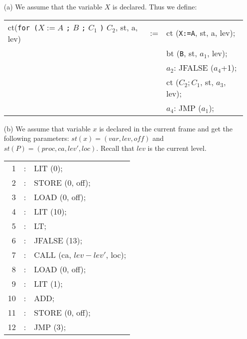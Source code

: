 \begin{solution}
  \begin{enumerate}
    \item[(a)] We assume that the variable $X$ is declared. Thus we define: \\
      \begin{tabular}{lcl}
        ct(\texttt{for ($X := A$} \texttt{;} $B$ \texttt{;} $C_1$ \texttt{)} $C_2$, st, a, lev) & := & 
                ct (\texttt{X:=A}, st, a, lev); \\
            & & bt (\texttt{B}, st, $a_1$, lev); \\
            & & $a_2$: JFALSE ($a_4$+1);  \\
            & & ct (\texttt{$C_2;C_1$}, st, $a_3$, lev);\\
            & & $a_4$: JMP ($a_1$);
      \end{tabular}

    \item[(b)] We assume that variable $x$ is declared in the current frame and get the following parameters:
      $st(x) = (var, lev, \textit{off})$ and $st(P)= (proc, ca, lev',loc)$. Recall that $lev$ is the current level.

      \begin{tabular}{rcl}
         1 & : \hspace{0.3cm} & LIT (0);\\
         2 & : \hspace{0.3cm} & STORE (0, off);\\
         3 & : \hspace{0.3cm} & LOAD (0, off);\\
         4 & : \hspace{0.3cm} & LIT (10);\\
         5 & : \hspace{0.3cm} & LT; \\
         6 & : \hspace{0.3cm} & JFALSE (13);\\
         7 & : \hspace{0.3cm} & CALL (ca, $lev-lev'$, loc);\\
         8 & : \hspace{0.3cm} & LOAD (0, off);\\
         9 & : \hspace{0.3cm} & LIT (1); \\
         10 & : \hspace{0.3cm} & ADD; \\
         11 & : \hspace{0.3cm} & STORE (0, off); \\
         12 & : \hspace{0.3cm} & JMP (3);
      \end{tabular}


\end{enumerate}
\end{solution}
